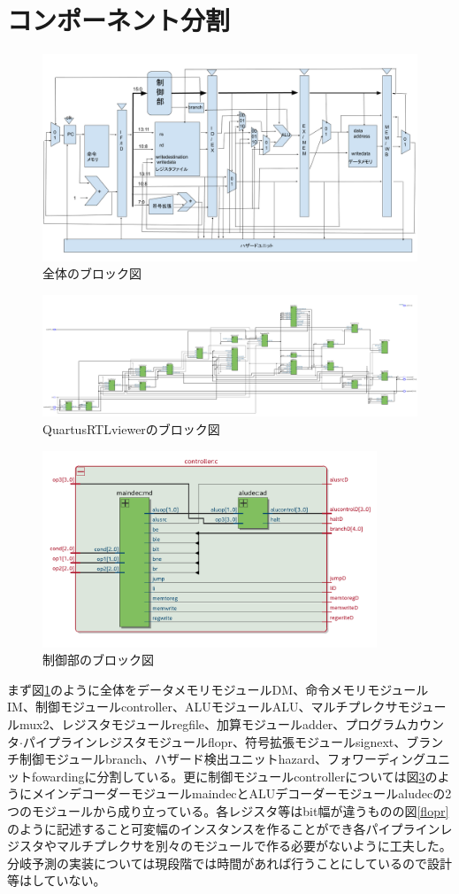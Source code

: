 \documentclass[a4paper,11pt,oneside,openany]{jsarticle}
\begin{document}
\section{コンポーネント分割}
\begin{figure}[h]
  \centering
  \includegraphics[width=12cm]{block.png}
  \caption{全体のブロック図}
  \label{block}
\end{figure}
\begin{figure}[h]
  \centering
  \includegraphics[width=15cm]{entire.png}
  \caption{QuartusRTLviewerのブロック図}
  \label{quartus}
\end{figure}
\begin{figure}[h]
  \centering
  \includegraphics[width=10cm]{controller.png}
  \caption{制御部のブロック図}
  \label{contr}
\end{figure}
まず図\ref{block}のように全体をデータメモリモジュールDM、命令メモリモジュールIM、制御モジュールcontroller、ALUモジュールALU、マルチプレクサモジュールmux2、レジスタモジュールregfile、加算モジュールadder、プログラムカウンタ$\cdot$パイプラインレジスタモジュールflopr、符号拡張モジュールsignext、ブランチ制御モジュールbranch、ハザード検出ユニットhazard、フォワーディングユニットfowardingに分割している。更に制御モジュールcontrollerについては図\ref{contr}のようにメインデコーダーモジュールmaindecとALUデコーダーモジュールaludecの2つのモジュールから成り立っている。各レジスタ等はbit幅が違うものの図\ref{flopr}のように記述すること可変幅のインスタンスを作ることができ各パイプラインレジスタやマルチプレクサを別々のモジュールで作る必要がないように工夫した。分岐予測の実装については現段階では時間があれば行うことにしているので設計等はしていない。
\end{document}
